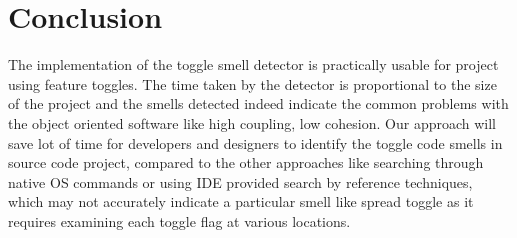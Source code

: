 \documentclass[conference]{IEEEtran}
\begin{document}
\section{Conclusion}
\label{conclusion}
The implementation of the toggle smell detector is practically usable for project using feature toggles. The time taken by the detector is proportional to the size of the project and the smells detected indeed indicate the common problems with the object oriented software like high coupling, low cohesion. Our approach will save lot of time for developers and designers to identify the toggle code smells in source code project, compared to the other approaches like searching through native OS commands or using IDE provided search by reference techniques, which may not accurately indicate a particular smell like spread toggle as it requires examining each toggle flag at various locations.





\balance
\end{document}
